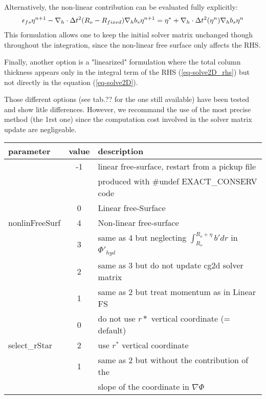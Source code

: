 Alternatively, the non-linear contribution can be evaluated fully
explicitly:
\begin{eqnarray*}
\epsilon_{fs} {\eta}^{n+1} -
{\bf \nabla}_h \cdot \Delta t^2 (R_o-R_{fixed})
{\bf \nabla}_h b_s {\eta}^{n+1}
= {\eta}^*
+{\bf \nabla}_h \cdot \Delta t^2 (\eta^{n})
{\bf \nabla}_h b_s {\eta}^{n}
\end{eqnarray*} 
This formulation allows one to keep the initial solver matrix
unchanged though throughout the integration, since the non-linear free
surface only affects the RHS.

Finally, another option is a "linearized" formulation where the total
column thickness appears only in the integral term of the RHS
(\ref{eq-solve2D_rhs}) but not directly in the equation
(\ref{eq-solve2D}).

Those different options (see tab.?? for the one still available)
have been tested and show litle differences. However, we recommand
the use of the most precise method (the 1rst one) since the 
computation cost involved in the solver matrix update are negligeable.

\begin{center}
 \begin{tabular}[htb]{|l|c|l|}
   \hline
   parameter & value & description \\ 
   \hline
                   & -1 & linear free-surface, restart from a pickup file \\
                   &    & produced with \#undef EXACT\_CONSERV code\\
   \cline{2-3}
                   & 0 & Linear free-Surface \\ 
   \cline{2-3}
    nonlinFreeSurf & 4 & Non-linear free-surface \\
   \cline{2-3}
                   & 3 & same as 4 but neglecting
                           $\int_{R_o}^{R_o+\eta} b' dr $ in $\Phi'_{hyd}$ \\
   \cline{2-3}
                   & 2 & same as 3 but do not update cg2d solver matrix \\
   \cline{2-3}
                  & 1 & same as 2 but treat momentum as in Linear FS \\
   \hline
                  & 0 & do not use $r*$ vertical coordinate (= default)\\
   \cline{2-3}
    select\_rStar & 2 & use $r^*$ vertical coordinate \\
   \cline{2-3}
                  & 1 & same as 2 but without the contribution of the\\
                  &   & slope of the coordinate in $\nabla \Phi$ \\
   \hline
  \end{tabular}
\end{center}


